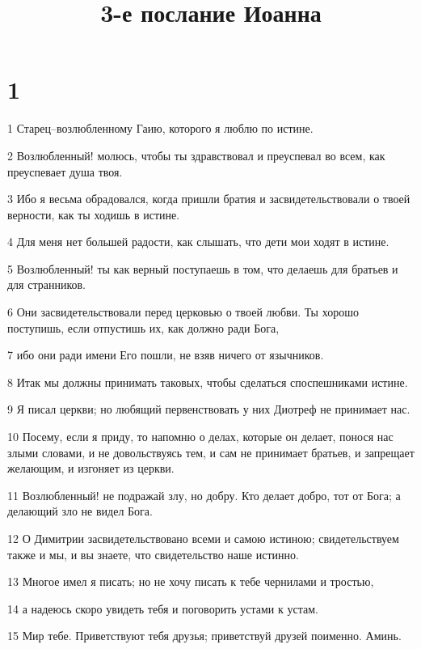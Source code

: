 

\title{3-е послание Иоанна}


\chapter{1}

\par 1 Старец--возлюбленному Гаию, которого я люблю по истине.
\par 2 Возлюбленный! молюсь, чтобы ты здравствовал и преуспевал во всем, как преуспевает душа твоя.
\par 3 Ибо я весьма обрадовался, когда пришли братия и засвидетельствовали о твоей верности, как ты ходишь в истине.
\par 4 Для меня нет большей радости, как слышать, что дети мои ходят в истине.
\par 5 Возлюбленный! ты как верный поступаешь в том, что делаешь для братьев и для странников.
\par 6 Они засвидетельствовали перед церковью о твоей любви. Ты хорошо поступишь, если отпустишь их, как должно ради Бога,
\par 7 ибо они ради имени Его пошли, не взяв ничего от язычников.
\par 8 Итак мы должны принимать таковых, чтобы сделаться споспешниками истине.
\par 9 Я писал церкви; но любящий первенствовать у них Диотреф не принимает нас.
\par 10 Посему, если я приду, то напомню о делах, которые он делает, понося нас злыми словами, и не довольствуясь тем, и сам не принимает братьев, и запрещает желающим, и изгоняет из церкви.
\par 11 Возлюбленный! не подражай злу, но добру. Кто делает добро, тот от Бога; а делающий зло не видел Бога.
\par 12 О Димитрии засвидетельствовано всеми и самою истиною; свидетельствуем также и мы, и вы знаете, что свидетельство наше истинно.
\par 13 Многое имел я писать; но не хочу писать к тебе чернилами и тростью,
\par 14 а надеюсь скоро увидеть тебя и поговорить устами к устам.
\par 15 Мир тебе. Приветствуют тебя друзья; приветствуй друзей поименно. Аминь.


